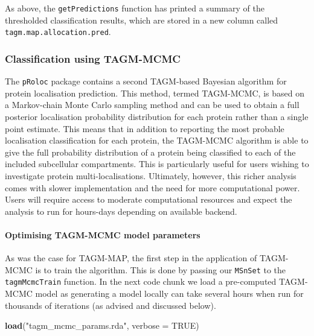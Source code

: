 \documentclass[9pt,a4paper,]{extarticle}
\newenvironment{Shaded}{\begin{snugshade}}{\end{snugshade}}
\newcommand{\AttributeTok}[1]{\textcolor[rgb]{0.13,0.29,0.53}{#1}}
\newcommand{\ConstantTok}[1]{\textcolor[rgb]{0.56,0.35,0.01}{#1}}
\newcommand{\FunctionTok}[1]{\textcolor[rgb]{0.13,0.29,0.53}{\textbf{#1}}}
\newcommand{\NormalTok}[1]{#1}
\newcommand{\StringTok}[1]{\textcolor[rgb]{0.31,0.60,0.02}{#1}}
\begin{document}
As above, the \texttt{getPredictions} function has printed a summary of the thresholded
classification results, which are stored in a new column called
\texttt{tagm.map.allocation.pred}.

\subsubsection{Classification using TAGM-MCMC}\label{classification-using-tagm-mcmc}

The \texttt{pRoloc} package contains a second TAGM-based Bayesian
algorithm for protein localisation prediction. This method, termed
TAGM-MCMC, is based on a Markov-chain Monte Carlo sampling method and can be
used to obtain a full posterior localisation probability distribution for each
protein rather than a single point estimate. This means that in addition to
reporting the most probable localisation classification for each protein, the
TAGM-MCMC algorithm is able to give the full probability distribution of a
protein being classified to each of the included subcellular compartments. This
is particularly useful for users wishing to investigate protein
multi-localisations. Ultimately, however, this richer analysis comes with slower
implementation and the need for more computational power. Users will require
access to moderate computational resources and expect the analysis to run for
hours-days depending on available backend.

\paragraph{Optimising TAGM-MCMC model parameters}\label{optimising-tagm-mcmc-model-parameters}

As was the case for TAGM-MAP, the first step in the application of TAGM-MCMC is
to train the algorithm. This is done by passing our \texttt{MSnSet} to the
\texttt{tagmMcmcTrain} function. In the next code chunk we load a pre-computed
TAGM-MCMC model as generating a model locally can take several hours when run
for thousands of iterations (as advised and discussed below).

\begin{Shaded}
\begin{Highlighting}[]
\FunctionTok{load}\NormalTok{(}\StringTok{"tagm\_mcmc\_params.rda"}\NormalTok{, }\AttributeTok{verbose =} \ConstantTok{TRUE}\NormalTok{)}
\end{Highlighting}
\end{Shaded}
\end{document}
